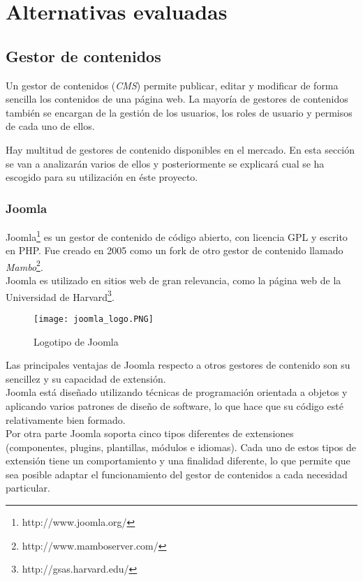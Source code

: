 \section{Alternativas evaluadas}

\subsection{Gestor de contenidos}
Un gestor de contenidos (\textit{CMS}) permite publicar, editar y modificar de forma sencilla los contenidos de una página web.  La mayoría de gestores de contenidos también se encargan de la gestión de los usuarios, los roles de usuario y permisos de cada uno de ellos.

Hay multitud de gestores de contenido disponibles en el mercado. En esta sección se van a analizarán varios de ellos y posteriormente se explicará cual se ha escogido para su utilización en éste proyecto.


\subsubsection{Joomla}
Joomla\footnote{http://www.joomla.org/} es un gestor de contenido de código abierto, con licencia GPL y escrito en PHP.  Fue creado en 2005 como un fork de otro gestor de contenido llamado \textit{Mambo}\footnote{http://www.mamboserver.com/}.\\
Joomla es utilizado en sitios web de gran relevancia, como la página web de la Universidad de Harvard\footnote{http://gsas.harvard.edu/}.

\begin{figure}[h]
\centering
\texttt{[image: joomla\_logo.PNG]}
\caption{Logotipo de Joomla}
\end{figure}

Las principales ventajas de Joomla respecto a otros gestores de contenido son su sencillez y su capacidad de extensión.\\
Joomla está diseñado utilizando técnicas de programación orientada a objetos y aplicando varios patrones de diseño de software, lo que hace que su código esté relativamente bien formado.\\
Por otra parte Joomla soporta cinco tipos diferentes de extensiones (componentes, plugins, plantillas, módulos e idiomas).  Cada uno de estos tipos de extensión tiene un comportamiento y una finalidad diferente, lo que permite que sea posible adaptar el funcionamiento del gestor de contenidos a cada necesidad particular.


